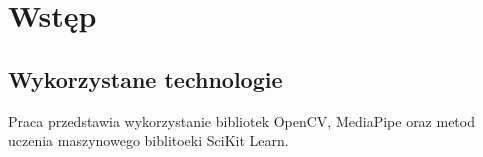 \chapter{Wstęp}


\section{Wykorzystane technologie}
Praca przedstawia wykorzystanie bibliotek OpenCV, MediaPipe oraz metod 
uczenia maszynowego biblitoeki SciKit Learn. 
